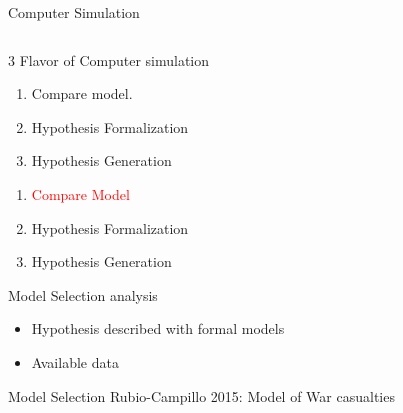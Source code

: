 \documentclass[12pt, notes=show]{beamer}
\begin{document}
\begin{frame}{Computer Simulation}
\begin{columns}
\begin{column}{.4\textwidth}
	\end{column}
    \end{columns}
	
\end{frame}

\begin{frame}{3 Flavor of Computer simulation}
	\begin{enumerate}
		\item Compare model.
			\vfill
		\item Hypothesis Formalization
			\vfill
		\item Hypothesis Generation
			\vfill
	\end{enumerate}
	
\end{frame}

\begin{frame}
    \begin{center}
	\begin{enumerate}
		\item \textcolor{red}{Compare Model}
		\item Hypothesis Formalization
		\item Hypothesis Generation
	\end{enumerate}
    \end{center}
\end{frame}

\begin{frame}{Model Selection analysis}
    \begin{itemize}
	\item<1-> Hypothesis described with formal models
	\item<2-> Available data
    \end{itemize}
    \vfill

\end{frame}


\begin{frame}{Model Selection}
    Rubio-Campillo 2015:  Model of War casualties
    \begin{center}
    \end{center}
\end{frame}
\end{document}
